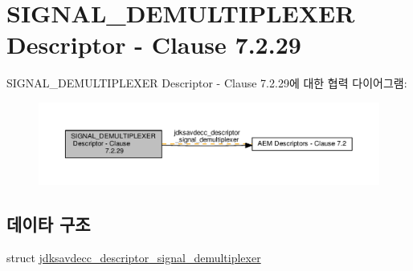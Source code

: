 \hypertarget{group__descriptor__signal__demultiplexer}{}\section{S\+I\+G\+N\+A\+L\+\_\+\+D\+E\+M\+U\+L\+T\+I\+P\+L\+E\+X\+ER Descriptor -\/ Clause 7.2.29}
\label{group__descriptor__signal__demultiplexer}
S\+I\+G\+N\+A\+L\+\_\+\+D\+E\+M\+U\+L\+T\+I\+P\+L\+E\+X\+ER Descriptor -\/ Clause 7.2.29에 대한 협력 다이어그램\+:
\nopagebreak
\begin{figure}[H]
\begin{center}
\leavevmode
\includegraphics[width=350pt]{group__descriptor__signal__demultiplexer}
\end{center}
\end{figure}
\subsection*{데이타 구조}
\begin{DoxyCompactItemize}
\item 
struct \hyperlink{structjdksavdecc__descriptor__signal__demultiplexer}{jdksavdecc\+\_\+descriptor\+\_\+signal\+\_\+demultiplexer}
\end{DoxyCompactItemize}
